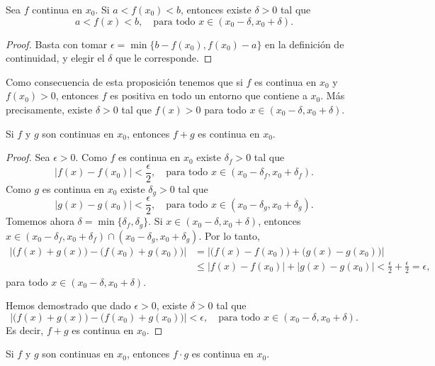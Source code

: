 \begin{proposition}\label{P:continua:cota en intervalo}
    Sea $f$ continua en $x_0$. Si $a<f(x_0)<b$, entonces existe $\delta>0$ tal que 
    \[
    a<f(x)<b, \quad\text{para todo $x\in (x_0-\delta,x_0+\delta)$}.
    \]
\end{proposition}

\begin{proof}
    Basta con tomar $\epsilon=\min\{b-f(x_0),f(x_0)-a\}$ en la definición de continuidad, y elegir el $\delta$ que le corresponde.
\end{proof}

Como consecuencia de esta proposición tenemos que si $f$ es continua en $x_0$ y $f(x_0)>0$, entonces $f$ es positiva en todo un entorno que contiene a $x_0$. Más precisamente, existe $\delta>0$ tal que $f(x)>0$ para todo $x\in (x_0-\delta,x_0+\delta)$.

\begin{proposition}
    Si $f$ y $g$ son continuas en $x_0$, entonces $f+g$ es continua en $x_0$.
\end{proposition}

\begin{proof}
Sea $\epsilon >0$.
Como $f$ es continua en $x_0$ existe $\delta_f>0$ tal que 
\[
|f(x)-f(x_0)|<\frac\epsilon2, \quad\text{para todo $x\in(x_0-\delta_f,x_0+\delta_f)$}.
\]
Como $g$ es continua en $x_0$ existe $\delta_g>0$ tal que 
\[
|g(x)-g(x_0)|<\frac\epsilon2, \quad\text{para todo $x\in(x_0-\delta_g,x_0+\delta_g)$}.
\]
Tomemos ahora $\delta=\min\{\delta_f,\delta_g\}$. Si $x\in(x_0-\delta,x_0+\delta)$, entonces $x\in(x_0-\delta_f,x_0+\delta_f)\cap(x_0-\delta_g,x_0+\delta_g)$.
Por lo tanto, 
\begin{align*}
\Big|\big(f(x)+g(x)\big)-\big(f(x_0)+g(x_0)\big)\Big|
&=\Big|\big(f(x)-f(x_0)\big)+\big(g(x)-g(x_0)\big)\Big|
\\
&\le \big|f(x)-f(x_0)\big|+\big|g(x)-g(x_0)\big|
<\frac\epsilon2+\frac\epsilon2=\epsilon,
\end{align*}
para todo $x\in(x_0-\delta,x_0+\delta)$.

Hemos demostrado que dado $\epsilon>0$, existe $\delta>0$ tal que 
\[
\Big|\big(f(x)+g(x)\big)-\big(f(x_0)+g(x_0)\big)\Big|
<\epsilon , \quad\text{para todo $x\in(x_0-\delta,x_0+\delta)$}.
\]
Es decir, $f+g$ es continua en $x_0$.
\end{proof}


\begin{proposition}
    Si $f$ y $g$ son continuas en $x_0$, entonces $f\cdot g$ es continua en $x_0$.
\end{proposition}


